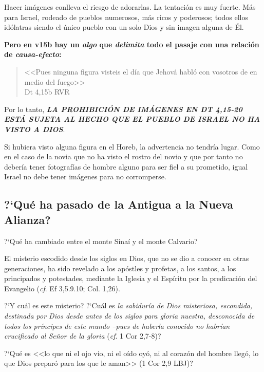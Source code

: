\documentclass{article}
\begin{document}
\noindent
Hacer im\'agenes conlleva el riesgo de adorarlas. La tentaci\'on es muy fuerte. M\'as para Israel, rodeado de pueblos numerosos, m\'as ricos y poderosos; todos ellos id\'olatras siendo el \'unico pueblo con un solo Dios y sin imagen alguna de \'El.

\textbf{Pero en v15b hay un \emph{algo} que \emph{delimita} todo el pasaje con una relaci\'on de \emph{causa-efecto}:}

\begin{quote}
<<Pues ninguna figura visteis el día que Jehová habló con vosotros de en medio del fuego>>\\
Dt 4,15b RVR
\end{quote}

\noindent
Por lo tanto, \emph{\textbf{LA PROHIBICI\'ON DE IM\'AGENES EN DT 4,15-20 EST\'A SUJETA AL HECHO QUE EL PUEBLO DE ISRAEL NO HA VISTO A DIOS}}.

Si hubiera visto alguna figura en el Horeb, la advertencia no tendr\'{i}a lugar. Como en el caso de la novia que no ha visto el rostro del novio y que por tanto no deber\'{i}a tener fotograf\'{i}as de hombre alguno para ser fiel a su prometido, igual Israel no debe tener im\'agenes para no corromperse.

\subsection{?`Qu\'e ha pasado de la Antigua a la Nueva Alianza?}
?`Qu\'e ha cambiado entre el monte Sina\'{i} y el monte Calvario?

El misterio escodido desde los siglos en Dios, que no se dio a conocer en otras generaciones, ha sido revelado a los ap\'ostles y profetas, a los santos, a los principados y potestades, mediante la Iglesia y el Esp\'{i}ritu por la predicaci\'on del Evangelio (\emph{cf}. Ef 3,5.9.10; Col. 1,26).

?`Y cu\'al es este misterio? ?`Cu\'al es \emph{la sabidur\'{i}a de Dios misteriosa, escondida, destinada por Dios desde antes de los siglos para gloria nuestra, desconocida de todos los pr\'{i}ncipes de este mundo --pues de haberla conocido no habr\'{i}an crucificado al Se\~nor de la gloria} (\emph{cf}. 1 Cor 2,7-8)?

?`Qu\'e es <<lo que ni el ojo vio, ni el oído oyó, ni al corazón del hombre llegó, lo que Dios preparó para los que le aman>> (1 Cor 2,9 LBJ)?
\end{document}
